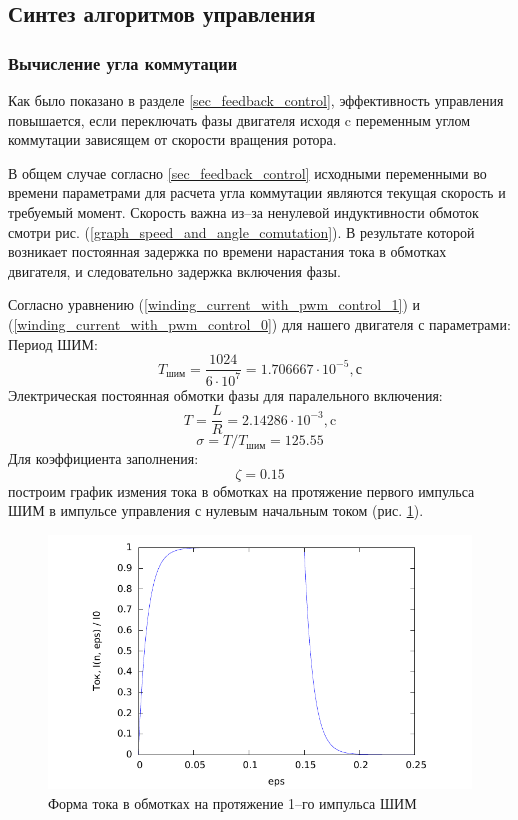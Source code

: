 \clearpage
\subsection{Синтез алгоритмов управления}
\subsubsection{Вычисление угла коммутации}
Как было показано в разделе \ref{sec_feedback_control}, эффективность управления
повышается, если переключать фазы двигателя исходя c переменным углом коммутации
зависящем от скорости вращения ротора.

В общем случае согласно \ref{sec_feedback_control} исходными переменными во
времени параметрами для расчета угла коммутации являются текущая скорость и
требуемый момент.
Скорость важна из--за ненулевой индуктивности обмоток смотри
рис. (\ref{graph_speed_and_angle_comutation}).
В результате которой возникает постоянная задержка по времени нарастания тока в
обмотках двигателя, и следовательно задержка включения фазы.

Согласно уравнению (\ref{winding_current_with_pwm_control_1}) и
    (\ref{winding_current_with_pwm_control_0})
для нашего двигателя с параметрами:
Период ШИМ:
$$
    T_\textit{шим} = \frac{1024}{6 \cdot 10^7} = 1.706667 \cdot 10^{-5}, \text{с}
$$
Электрическая постоянная обмотки фазы для паралельного включения:
$$
    T = \frac{L}{R} = 2.14286 \cdot 10^{-3}, \text{c}
$$
$$
    \sigma = T / T_\textit{шим} = 125.55
$$
Для коэффициента заполнения:
$$
    \zeta = 0.15
$$
построим график измения тока в обмотках на протяжение первого импульса ШИМ в
импульсе управления с нулевым начальным током (рис. \ref{i_step__varepsilon}).

\begin{figure}[ht]
    \centering
    \includegraphics[width=\linewidth, keepaspectratio]
                    {./src/pictures/i_step__varepsilon.pdf}
    \caption{Форма тока в обмотках на протяжение 1--го импульса ШИМ}
    \label{i_step__varepsilon}
\end{figure}

